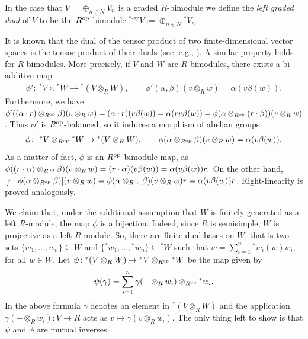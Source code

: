 \documentclass[pdftex]{sigma}
\newcommand\ot{\otimes}
\newcommand\rar{\rightarrow}
\renewcommand{\^}[1]{\mbox{$^{\left( #1 \right)}$}}
\renewcommand{\_}[1]{\mbox{$_{\left( #1 \right)}$}}
\numberwithin{equation}{section}
\begin{document}
In the case that $V=\oplus_{n\in N}V_n $ is a graded $R$-bimodule we def\/ine the \textit{left graded dual} of $V$ to be the $R^{\rm op}$-bimodule $^{*\text{-gr}}V:=\oplus_{n\in N}{^*V_n}$.

It is known that the dual of the tensor product of two f\/inite-dimensional vector spaces is the tensor product of their duals (see, e.g., \cite[Section~2.7]{bgs}). A similar property holds for $R$-bimodules. More precisely, if $V$ and $W$ are $R$-bimodules, there exists a bi-additive map
\begin{gather*}
\phi'\colon \ {^*V} \times {^*W} \rar {^*(V \ot_R W)}, \qquad \phi'(\alpha , \beta)(v\ot_R w)=\alpha(v\beta(w)).
\end{gather*}
Furthermore, we have $\phi'((\alpha \cdot r) \ot_{R^{\rm op}} \beta)(v \ot_R w)=(\alpha \cdot r)(v\beta(w))=\alpha(rv\beta(w))=\phi(\alpha \ot_{R^{\rm op}} (r \cdot \beta))(v \ot_R w)$. Thus $\phi'$ is $R^{\rm op}$-balanced, so it induces a morphism of abelian groups
\begin{gather*}
\phi\colon \ {^*V} \ot_{R^{\rm op}} {^*W} \rar {^*(V \ot_R W)}, \qquad \phi(\alpha \ot_{R^{\rm op}} \beta)(v\ot_R w)=\alpha(v\beta(w)).
\end{gather*}
As a matter of fact, $\phi$ is an $R^{\rm op}$-bimodule map, as $\phi((r \cdot \alpha) \ot_{R^{\rm op}} \beta)(v \ot_R w)=(r\cdot \alpha)(v\beta(w))=\alpha(v\beta(w)) r.$ On the other hand, $[r \cdot \phi(\alpha \ot_{R^{\rm op}} \beta)](v \ot_R w)=\phi(\alpha \ot_{R^{\rm op}} \beta)(v \ot_R w)r=\alpha(v\beta(w))r$. Right-linearity is proved analogously.

We claim that, under the additional assumption that $W$ is f\/initely generated as a left $R$-module, the map $\phi$ is a bijection. Indeed, since $R$ is semisimple, $W$ is projective as a left $R$-module. So, there are f\/inite dual bases on $W$, that is two sets $\{w_1,\dots,w_n\}\subseteq W$ and $\{{^*}w_1,\dots,{^*}w_n\}\subseteq {^*}W$ such that $w=\sum\limits_{i=1}^n{^*}w_i(w)w_i$, for all $w\in W$.
 Let $\psi\colon {}^*(V\ot_R W) \to {}^*V\ot_{R^{\rm op}}{^*W} $ be the map given by
\begin{gather*}
\psi(\gamma) = \sum_{i=1}^n \gamma(- \ot_R w_i) \ot_{R^{\rm op}}{}^*w_i.
\end{gather*}
In the above formula $\gamma$ denotes an element in ${^*}(V \ot_R W)$ and the application $\gamma(- \ot_R w_i) \colon V \rar R$ acts as $v \mapsto \gamma(v \ot_R w_i)$. The only thing left to show is that $\psi$ and $\phi$ are mutual inverses.
\end{document}
